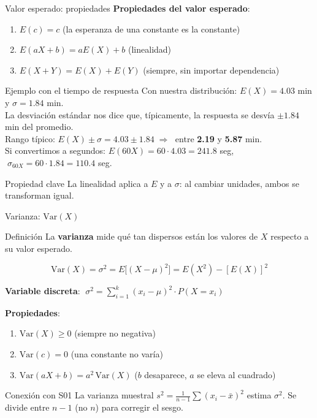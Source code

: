 \documentclass[aspectratio=169, 11pt]{beamer}
\begin{document}
\begin{frame}{Valor esperado: propiedades}
\textbf{Propiedades del valor esperado}:
\begin{enumerate}
\item $E(c) = c$ \hfill (la esperanza de una constante es la constante)
\item $E(aX + b) = aE(X) + b$ \hfill (linealidad)
\item $E(X + Y) = E(X) + E(Y)$ \hfill (siempre, sin importar dependencia)
\end{enumerate}

\vspace{0.3em}
\begin{exampleblock}{Ejemplo con el tiempo de respuesta}
\small
Con nuestra distribuci\'on: $E(X) = 4.03$ min y $\sigma = 1.84$ min.\\[4pt]
La desviaci\'on est\'andar nos dice que, t\'ipicamente, la respuesta se desv\'ia $\pm 1.84$ min del promedio.\\[4pt]
Rango t\'ipico: $E(X) \pm \sigma = 4.03 \pm 1.84 \;\Rightarrow\;$ entre \textbf{2.19} y \textbf{5.87} min.\\[4pt]
Si convertimos a segundos: $E(60X) = 60 \cdot 4.03 = 241.8$ seg, $\;\sigma_{60X} = 60 \cdot 1.84 = 110.4$ seg.
\end{exampleblock}

\begin{alertblock}{Propiedad clave}
La linealidad aplica a $E$ y a $\sigma$: al cambiar unidades, ambos se transforman igual.
\end{alertblock}
\end{frame}

\begin{frame}{Varianza: $\text{Var}(X)$}
\begin{block}{Definición}
La \textbf{varianza} mide qu\'e tan dispersos est\'an los valores de $X$ respecto a su valor esperado.
\end{block}

\[
\text{Var}(X) = \sigma^2 = E\!\big[(X - \mu)^2\big] = E(X^2) - [E(X)]^2
\]

\small
\textbf{Variable discreta}: $\;\sigma^2 = \sum_{i=1}^{k} (x_i - \mu)^2 \cdot P(X = x_i)$

\textbf{Propiedades}:
\begin{enumerate}\setlength{\itemsep}{1pt}
\item $\text{Var}(X) \geq 0$ \hfill (siempre no negativa)
\item $\text{Var}(c) = 0$ \hfill (una constante no var\'ia)
\item $\text{Var}(aX + b) = a^2 \,\text{Var}(X)$ \hfill ($b$ desaparece, $a$ se eleva al cuadrado)
\end{enumerate}

\begin{exampleblock}{Conexión con S01}
La varianza muestral $s^2 = \frac{1}{n-1}\sum(x_i - \bar{x})^2$ estima $\sigma^2$.
Se divide entre $n-1$ (no $n$) para corregir el sesgo.
\end{exampleblock}
\end{frame}
\end{document}
